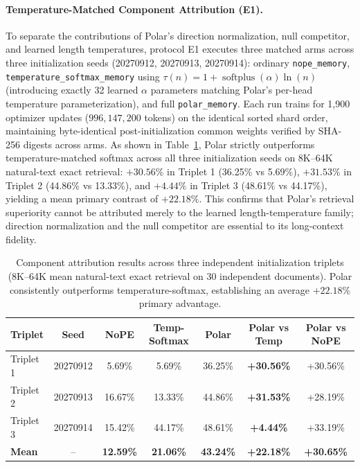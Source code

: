 \paragraph{Temperature-Matched Component Attribution (E1).}
To separate the contributions of Polar's direction normalization, null competitor, and learned length temperatures, protocol E1 executes three matched arms across three initialization seeds (20270912, 20270913, 20270914): ordinary \texttt{nope\_memory}, \texttt{temperature\_softmax\_memory} using $\tau(n) = 1 + \operatorname{softplus}(\alpha) \ln(n)$ (introducing exactly 32 learned $\alpha$ parameters matching Polar's per-head temperature parameterization), and full \texttt{polar\_memory}. Each run trains for 1,900 optimizer updates ($996{,}147{,}200$ tokens) on the identical sorted shard order, maintaining byte-identical post-initialization common weights verified by SHA-256 digests across arms. As shown in Table~\ref{table:component_attribution_e1}, Polar strictly outperforms temperature-matched softmax across all three initialization seeds on 8K--64K natural-text exact retrieval: $+30.56\%$ in Triplet 1 (36.25\% vs 5.69\%), $+31.53\%$ in Triplet 2 (44.86\% vs 13.33\%), and $+4.44\%$ in Triplet 3 (48.61\% vs 44.17\%), yielding a mean primary contrast of $+22.18\%$. This confirms that Polar's retrieval superiority cannot be attributed merely to the learned length-temperature family; direction normalization and the null competitor are essential to its long-context fidelity.

\begin{table}[!ht]
\centering
\small
\setlength{\tabcolsep}{5pt}
\begin{tabular}{lcccccc}
\toprule
\textbf{Triplet} & \textbf{Seed} & \textbf{NoPE} & \textbf{Temp-Softmax} & \textbf{Polar} & \textbf{Polar vs Temp} & \textbf{Polar vs NoPE} \\
\midrule
Triplet 1 & 20270912 & 5.69\% & 5.69\% & 36.25\% & \textbf{+30.56\%} & +30.56\% \\
Triplet 2 & 20270913 & 16.67\% & 13.33\% & 44.86\% & \textbf{+31.53\%} & +28.19\% \\
Triplet 3 & 20270914 & 15.42\% & 44.17\% & 48.61\% & \textbf{+4.44\%} & +33.19\% \\
\midrule
\textbf{Mean} & -- & \textbf{12.59\%} & \textbf{21.06\%} & \textbf{43.24\%} & \textbf{+22.18\%} & \textbf{+30.65\%} \\
\bottomrule
\end{tabular}
\caption{Component attribution results across three independent initialization triplets (8K--64K mean natural-text exact retrieval on 30 independent documents). Polar consistently outperforms temperature-softmax, establishing an average $+22.18\%$ primary advantage.}
\label{table:component_attribution_e1}
\end{table}

